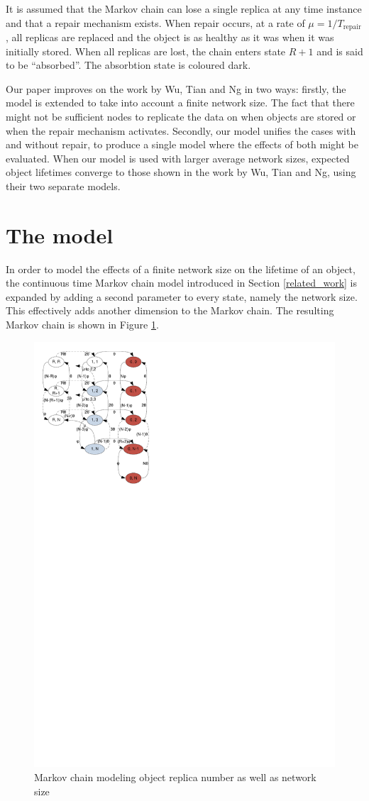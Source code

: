 \documentclass[10pt,a4paper,conference]{IEEEtran}
\begin{document}
It is assumed that the Markov chain can lose a single replica at any time instance and that a repair mechanism exists. When repair occurs, at a rate of $\mu = 1/T_{\textrm{repair}}$, all replicas are replaced and the object is as healthy as it was when it was initially stored. When all replicas are lost, the chain enters state $R+1$ and is said to be ``absorbed''. The absorbtion state is coloured dark.

Our paper improves on the work by Wu, Tian and Ng \cite{replication_article} in two ways: firstly, the model is extended to take into account a finite network size. The fact that there might not be sufficient nodes to replicate the data on when objects are stored or when the repair mechanism activates. Secondly, our model unifies the cases with and without repair, to produce a single model where the effects of both might be evaluated. When our model is used with larger average network sizes, expected object lifetimes converge to those shown in the work by Wu, Tian and Ng, using their two separate models.

\section{The model}
\label{model}

In order to model the effects of a finite network size on the lifetime of an object, the continuous time Markov chain model introduced in Section \ref{related_work} is expanded by adding a second parameter to every state, namely the network size. This effectively adds another dimension to the Markov chain. The resulting Markov chain is shown in Figure \ref{fig_markov_chain}.

\begin{figure}[htbp]
 \centering
 \includegraphics[clip=true, viewport=0.5cm 19.5cm 8.5cm 29.5cm, width=0.7\columnwidth]{Markov_chain_repair_compact}
 \caption{Markov chain modeling object replica number as well as network size}
 \label{fig_markov_chain}
\end{figure}
\end{document}
